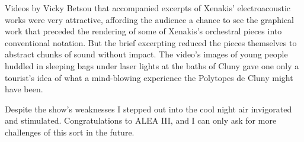 Videos by Vicky Betsou that accompanied excerpts of Xenakis’ electroacoustic works were very attractive, affording the audience a chance to see the graphical work that preceded the rendering of some of Xenakis’s orchestral pieces into conventional notation. But the brief excerpting reduced the pieces themselves to abstract chunks of sound without impact. The video’s images of young people huddled in sleeping bags under laser lights at the baths of Cluny gave one only a tourist’s idea of what a mind-blowing experience the Polytopes de Cluny might have been.

Despite the show’s weaknesses I stepped out into the cool night air invigorated and stimulated. Congratulations to ALEA III, and I can only ask for more challenges of this sort in the future.
